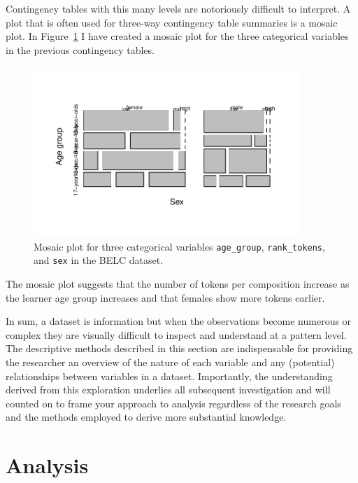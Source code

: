 \documentclass[
  letterpaper,
]{latex/krantz}
\begin{document}
Contingency tables with this many levels are notoriously difficult to
interpret. A plot that is often used for three-way contingency table
summaries is a mosaic plot. In
Figure~\ref{fig-summaries-multivariate-mosaic-belc} I have created a
mosaic plot for the three categorical variables in the previous
contingency tables.

\begin{figure}

{\centering \includegraphics[width=0.9\textwidth,height=\textheight]{./approaching-analysis_files/figure-pdf/fig-summaries-multivariate-mosaic-belc-1.pdf}

}

\caption{\label{fig-summaries-multivariate-mosaic-belc}Mosaic plot for
three categorical variables \texttt{age\_group}, \texttt{rank\_tokens},
and \texttt{sex} in the BELC dataset.}

\end{figure}

The mosaic plot suggests that the number of tokens per composition
increase as the learner age group increases and that females show more
tokens earlier.

In sum, a dataset is information but when the observations become
numerous or complex they are visually difficult to inspect and
understand at a pattern level. The descriptive methods described in this
section are indispensable for providing the researcher an overview of
the nature of each variable and any (potential) relationships between
variables in a dataset. Importantly, the understanding derived from this
exploration underlies all subsequent investigation and will counted on
to frame your approach to analysis regardless of the research goals and
the methods employed to derive more substantial knowledge.

\hypertarget{analysis}{%
\section{Analysis}\label{analysis}}
\end{document}
